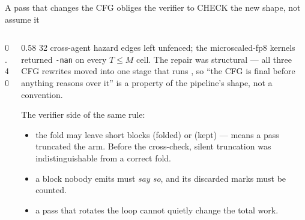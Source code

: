 \begin{frame}{A pass that changes the CFG obliges the verifier to CHECK the new shape, not assume it}
\begin{columns}[T]
\begin{column}{0.40\textwidth}
\centering
{}

\vspace{2pt}
\end{column}
\begin{column}{0.58\textwidth}
\scriptsize
{} 32 cross-agent hazard edges left unfenced; the microscaled-fp8 kernels returned
\texttt{-nan} on every $T \le M$ cell. The repair was structural --- all three CFG rewrites moved
into one stage that runs , so ``the CFG is final before anything reasons over it'' is a
property of the pipeline's shape, not a convention.

\vspace{4pt}
The verifier side of the same rule:
\begin{itemize}\itemsep2pt
  \item {} the fold may leave  short blocks (folded) or  (kept)
        ---  means a pass truncated the arm. Before the cross-check, silent
        truncation was indistinguishable from a correct fold.
  \item {} a block nobody emits must \emph{say so}, and its discarded marks must be counted.
  \item {} a pass that rotates the loop cannot quietly change the total work.
\end{itemize}

\vspace{3pt}
\end{column}
\end{columns}
\end{frame}
